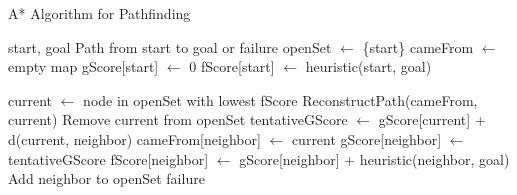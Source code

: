 \begin{algorithm}
\caption{A* Algorithm for Pathfinding}
\label{alg:astar}
\begin{algorithmic}
    \REQUIRE start, goal
    \ENSURE Path from start to goal or failure
    \STATE openSet $\gets$ \{start\}
    \STATE cameFrom $\gets$ empty map
    \STATE gScore[start] $\gets$ 0
    \STATE fScore[start] $\gets$ heuristic(start, goal)
    
        \STATE current $\gets$ node in openSet with lowest fScore
            \STATE
            \RETURN ReconstructPath(cameFrom, current)
        \ENDIF
        \STATE Remove current from openSet
            \STATE tentativeGScore $\gets$ gScore[current] + d(current, neighbor)
                \STATE cameFrom[neighbor] $\gets$ current
                \STATE gScore[neighbor] $\gets$ tentativeGScore
                \STATE fScore[neighbor] $\gets$ gScore[neighbor] + heuristic(neighbor, goal)
                    \STATE Add neighbor to openSet
                \ENDIF
            \ENDIF
        \ENDFOR
    \ENDWHILE
    \RETURN failure
\end{algorithmic}
\end{algorithm}
